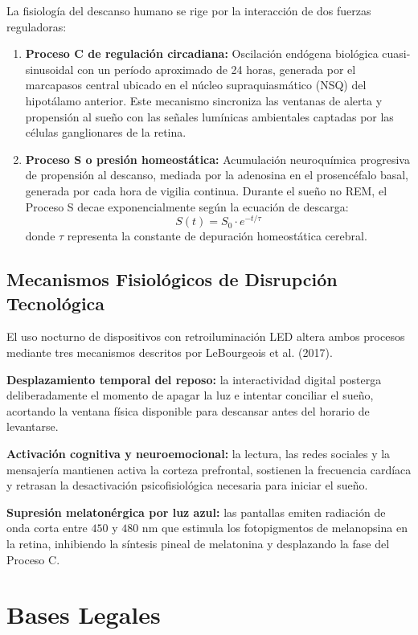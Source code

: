 \documentclass[12pt, letterpaper]{article}
\begin{document}
La fisiología del descanso humano se rige por la interacción de dos fuerzas reguladoras:

\begin{enumerate}
    \item \textbf{Proceso C de regulación circadiana:} Oscilación endógena biológica cuasi-sinusoidal con un período aproximado de 24 horas, generada por el marcapasos central ubicado en el núcleo supraquiasmático (NSQ) del hipotálamo anterior. Este mecanismo sincroniza las ventanas de alerta y propensión al sueño con las señales lumínicas ambientales captadas por las células ganglionares de la retina.
    \item \textbf{Proceso S o presión homeostática:} Acumulación neuroquímica progresiva de propensión al descanso, mediada por la adenosina en el prosencéfalo basal, generada por cada hora de vigilia continua. Durante el sueño no REM, el Proceso S decae exponencialmente según la ecuación de descarga:
    $$S(t) = S_0 \cdot e^{-t/\tau}$$
    donde $\tau$ representa la constante de depuración homeostática cerebral.
\end{enumerate}

\subsection{Mecanismos Fisiológicos de Disrupción Tecnológica}

El uso nocturno de dispositivos con retroiluminación LED altera ambos procesos mediante tres mecanismos descritos por LeBourgeois et al. (2017).

\textbf{Desplazamiento temporal del reposo:} la interactividad digital posterga deliberadamente el momento de apagar la luz e intentar conciliar el sueño, acortando la ventana física disponible para descansar antes del horario de levantarse.

\textbf{Activación cognitiva y neuroemocional:} la lectura, las redes sociales y la mensajería mantienen activa la corteza prefrontal, sostienen la frecuencia cardíaca y retrasan la desactivación psicofisiológica necesaria para iniciar el sueño.

\textbf{Supresión melatonérgica por luz azul:} las pantallas emiten radiación de onda corta entre $450$ y $480\text{ nm}$ que estimula los fotopigmentos de melanopsina en la retina, inhibiendo la síntesis pineal de melatonina y desplazando la fase del Proceso C.


\section{Bases Legales}
\end{document}
